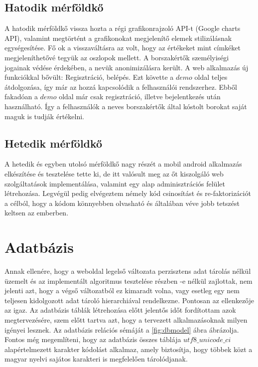 \documentclass[12pt]{report}
\theoremstyle{definition}
\begin{document}
	\subsection{Hatodik mérföldkő}A hatodik mérföldkő vissza hozta a régi grafikonrajzoló API-t (Google charts API), valamint megtörtént a grafikonokat megjelenítő elemek stilizálásnak egységesítése. Fő ok a visszaváltásra az volt, hogy az értékeket mint címkéket megjeleníthetővé tegyük az oszlopok mellett. A borszakértők személyiségi jogainak védése érdekében, a nevük anonimizálásra került. A web alkalmazás új funkciókkal bővült: Regisztráció, belépés. Ezt követte a $demo$ oldal teljes átdolgozása, így már az hozzá kapcsolódik a felhasználói rendszerhez. Ebből fakadóan a $demo$ oldal már csak regisztráció, illetve bejelentkezés után használható. \uppercase{í}gy a felhasználók a neves borszakértők által kóstolt borokat saját maguk is tudják értékelni.
	
	\subsection{Hetedik mérföldkő}A hetedik és egyben utolsó mérföldkő nagy részét a mobil android alkalmazás elkészítése és tesztelése tette ki, de itt valósult meg az őt kiszolgáló web szolgáltatások implementálása, valamint egy alap adminisztrációs felület létrehozása. Legvégül pedig elvégeztem némely kód csinosítást és re-faktorizációt a célból, hogy a kódom könnyebben olvasható és általában véve jobb tetszést keltsen az emberben.
	
	\section{Adatbázis}
	Annak ellenére, hogy a weboldal legelső változata perzisztens adat tárolás nélkül üzemelt és az implementált algoritmus tesztelése részben -e nélkül zajlottak, nem jelenti azt, hogy a végső változatból ez kimaradt volna, vagy esetleg egy nem teljesen kidolgozott adat tároló hierarchiával rendelkezne. Pontosan az ellenkezője az igaz. Az adatbázis táblák létrehozása előtt jelentős időt fordítottam azok megtervezésére, szem előtt tartva azt, hogy a tervezett alkalmazásoknak milyen igényei lesznek. Az adatbázis relációs sémáját a \ref{fig:dbmodel} ábra ábrázolja. Fontos még megemlíteni, hogy az adatbázis összes táblája $utf8\_unicode\_ci$ alapértelmezett karakter kódolást alkalmaz, amely biztosítja, hogy többek közt a magyar nyelvi sajátos karakteri is megfelelően tárolódjanak.
	
\end{document}

